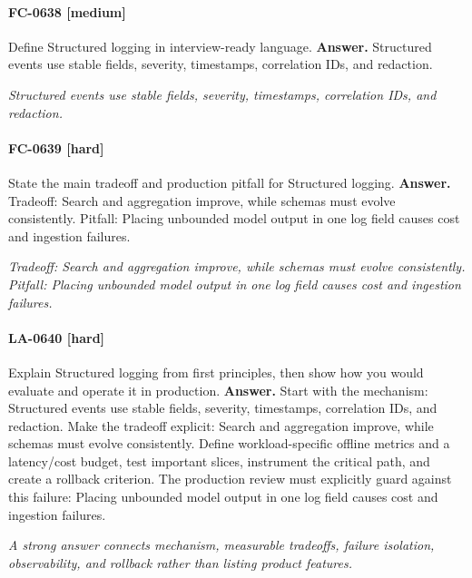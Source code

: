 \paragraph{FC-0638 [medium]} Define Structured logging in interview-ready language.
\noindent\textbf{Answer.} Structured events use stable fields, severity, timestamps, correlation IDs, and redaction.
\par\textit{Structured events use stable fields, severity, timestamps, correlation IDs, and redaction.}
\paragraph{FC-0639 [hard]} State the main tradeoff and production pitfall for Structured logging.
\noindent\textbf{Answer.} Tradeoff: Search and aggregation improve, while schemas must evolve consistently. Pitfall: Placing unbounded model output in one log field causes cost and ingestion failures.
\par\textit{Tradeoff: Search and aggregation improve, while schemas must evolve consistently. Pitfall: Placing unbounded model output in one log field causes cost and ingestion failures.}
\paragraph{LA-0640 [hard]} Explain Structured logging from first principles, then show how you would evaluate and operate it in production.
\noindent\textbf{Answer.} Start with the mechanism: Structured events use stable fields, severity, timestamps, correlation IDs, and redaction. Make the tradeoff explicit: Search and aggregation improve, while schemas must evolve consistently. Define workload-specific offline metrics and a latency/cost budget, test important slices, instrument the critical path, and create a rollback criterion. The production review must explicitly guard against this failure: Placing unbounded model output in one log field causes cost and ingestion failures.
\par\textit{A strong answer connects mechanism, measurable tradeoffs, failure isolation, observability, and rollback rather than listing product features.}
